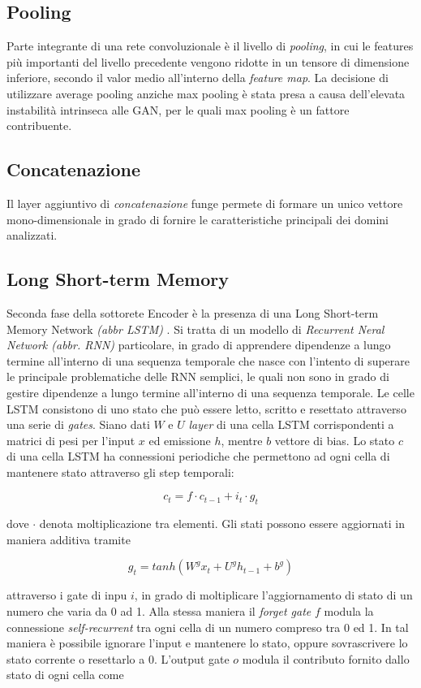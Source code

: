 \subsection{Pooling}
Parte integrante di una rete convoluzionale è il livello di \textit{pooling}, in cui le features più importanti del livello precedente vengono ridotte in un tensore di dimensione inferiore, secondo il valor medio all'interno della \textit{feature map}. La decisione di utilizzare average pooling anziche max pooling è stata presa a causa dell'elevata instabilità intrinseca alle GAN, per le quali max pooling è un fattore contribuente. 

\subsection{Concatenazione}
Il layer aggiuntivo di \textit{concatenazione} funge permete di formare un unico vettore mono-dimensionale in grado di fornire le caratteristiche principali dei domini analizzati.

\subsection{Long Short-term Memory}
Seconda fase della sottorete Encoder è la presenza di una Long Short-term Memory Network \textit{(abbr LSTM)} \cite{LSTM}. Si tratta di un modello di \textit{Recurrent Neral Network (abbr. RNN)} particolare, in grado di apprendere dipendenze a lungo termine all'interno di una sequenza temporale che nasce con l'intento di superare le principale problematiche delle RNN semplici, le quali non sono in grado di gestire dipendenze a lungo termine all'interno di una sequenza temporale. Le celle LSTM consistono di uno stato che può essere letto, scritto e resettato attraverso una serie di \textit{gates}. Siano dati $W$ e $U$ \textit{layer} di una cella LSTM corrispondenti a matrici di pesi per l'input $x$ ed emissione $h$, mentre $b$ vettore di bias. Lo stato $c$ di una cella LSTM ha connessioni periodiche che permettono ad ogni cella di mantenere stato attraverso gli step temporali:

\[c_t = f \cdot c_{t-1} + i_t \cdot g_t\]

dove $\cdot$ denota moltiplicazione tra elementi. Gli stati possono essere aggiornati in maniera additiva tramite

\[g_t = tanh(W^gx_t + U^gh_{t-1}+b^g)\]


attraverso i gate di inpu $i$, in grado di moltiplicare l'aggiornamento di stato di un numero che varia da 0 ad 1. Alla stessa maniera il \textit{forget gate} $f$ modula la connessione \textit{self-recurrent} tra ogni cella di un numero compreso tra 0 ed 1. In tal maniera è possibile ignorare l'input e mantenere lo stato, oppure sovrascrivere lo stato corrente o resettarlo a 0.
L'output gate $o$ modula il contributo fornito dallo stato di ogni cella come

